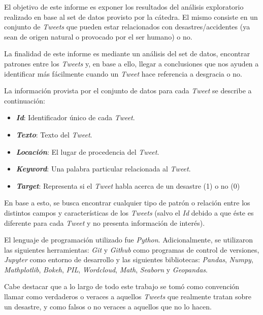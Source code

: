 \documentclass[titlepage,a4paper]{article}
\begin{document}
    El objetivo de este informe es exponer los resultados del análisis exploratorio realizado en base al set de datos provisto por la cátedra. El mismo consiste en un conjunto de \textit{Tweets} que pueden estar relacionados con desastres/accidentes (ya sean de origen natural o provocado por el ser humano) o no.
    
    La finalidad de este informe es mediante un análisis del set de datos, encontrar patrones entre los \textit{Tweets} y, en base a ello, llegar a conclusiones que nos ayuden a identificar más fácilmente cuando un \textit{Tweet} hace referencia a desgracia o no. 
    
    La información provista por el conjunto de datos para cada \textit{Tweet} se describe a continuación:

    \begin{itemize}
        \item \textbf{\textit{Id}}: Identificador único de cada \textit{Tweet}.
        \item \textbf{\textit{Texto}}: Texto del \textit{Tweet}.
        \item \textbf{\textit{Locación}}: El lugar de procedencia del \textit{Tweet}. 
        \item \textbf{\textit{Keyword}}: Una palabra particular relacionada al \textit{Tweet}.
        \item \textbf{\textit{Target}}: Representa si el \textit{Tweet} habla acerca de un desastre (1) o no (0)
    \end{itemize}
 
    En base a esto, se busca encontrar cualquier tipo de patrón o relación entre los distintos campos y características de los \textit{Tweets} (salvo el \textit{Id} debido a que éste es diferente para cada \textit{Tweet} y no presenta información de interés).
    
    El lenguaje de programación utilizado fue \textit{Python}. Adicionalmente, se utilizaron las siguientes herramientas: \textit{Git} y \textit{Github} como programas de control de versiones, \textit{Jupyter} como entorno de desarrollo y las siguientes bibliotecas: \textit{Pandas}, \textit{Numpy}, \textit{Mathplotlib}, \textit{Bokeh}, \textit{PIL}, \textit{Wordcloud}, \textit{Math}, \textit{Seaborn} y \textit{Geopandas}.
    
    Cabe destacar que a lo largo de todo este trabajo se tomó como convención llamar como verdaderos o veraces a aquellos \textit{Tweets} que realmente tratan sobre un desastre, y como falsos o no veraces a aquellos que no lo hacen.
    
\end{document}

